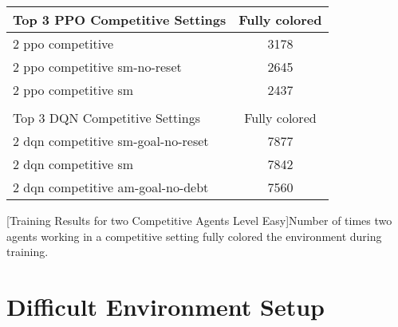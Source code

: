 \begin{center}
    \begin{tabular}{lc}\hline
        Top 3 PPO Competitive Settings & Fully colored \\ \hline
        2 ppo competitive & 3178 \\
        2 ppo competitive sm-no-reset & 2645 \\
        2 ppo competitive sm & 2437 \\ \hline
         &   \\ \hline
        Top 3 DQN Competitive Settings & Fully colored \\ \hline
        2 dqn competitive sm-goal-no-reset & 7877 \\
        2 dqn competitive sm & 7842 \\
        2 dqn competitive am-goal-no-debt & 7560 \\ \hline
        \end{tabular}
        [Training Results for two Competitive Agents Level Easy]{Number of times two agents working in a competitive setting fully colored the environment during training.}\label{t:2-comp-easy}
    \end{center}


\section{Difficult Environment Setup} \label{difficult_env}